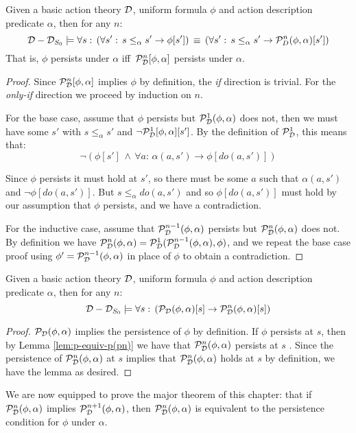 \begin{lemma}
Given a basic action theory $\mathcal{D}$, uniform formula $\phi$
and action description predicate $\alpha$, then for any $n$:\label{lem:p-equiv-p(pn)}\[
\mathcal{D}-\mathcal{D}_{S_{0}}\models\forall s:\,\left(\forall s':\, s\leq_{\alpha}s'\rightarrow\phi[s']\right)\,\equiv\,\left(\forall s':\, s\leq_{\alpha}s'\rightarrow\mathcal{P}_{D}^{n}(\phi,\alpha)[s']\right)\]
 That is, $\phi$ persists under $\alpha$ iff $\,\mathcal{P}_{\mathcal{D}}^{n}[\phi,\alpha]$
persists under $\alpha$. 
\end{lemma}
\begin{proof}
Since $\mathcal{P}_{\mathcal{D}}^{n}[\phi,\alpha]$ implies $\phi$ by definition,
the \emph{if} direction is trivial. For the \emph{only-if} direction
we proceed by induction on $n$.

For the base case, assume that $\phi$ persists but $\mathcal{P}_{\mathcal{D}}^{1}(\phi,\alpha)$
does not, then we must have some $s'$ with $s\leq_{\alpha}s'$ and
$\neg\mathcal{P}_{\mathcal{D}}^{1}[\phi,\alpha][s']$. By the definition of $\mathcal{P}_{\mathcal{D}}^{1}$,
this means that:\[
\neg\left(\phi[s']\,\wedge\,\forall a:\,\alpha(a,s')\rightarrow\phi[do(a,s')]\right)\]


Since $\phi$ persists it must hold at $s'$, so there must be some
$a$ such that $\alpha(a,s')$ and $\neg\phi[do(a,s')]$. But $s\leq_{\alpha}do(a,s')$
and so $\phi[do(a,s')]$ must hold by our assumption that $\phi$
persists, and we have a contradiction.

For the inductive case, assume that $\mathcal{P}_{\mathcal{D}}^{n-1}(\phi,\alpha)$
persists but $\mathcal{P}_{\mathcal{D}}^{n}(\phi,\alpha)$ does not. By definition
we have $\mathcal{P}_{\mathcal{D}}^{n}(\phi,\alpha)=\mathcal{P}_{\mathcal{D}}^{1}(\mathcal{P}_{\mathcal{D}}^{n-1}(\phi,\alpha),\phi)$,
and we repeat the base case proof using $\phi'=\mathcal{P}_{\mathcal{D}}^{n-1}(\phi,\alpha)$
in place of $\phi$ to obtain a contradiction. 
\end{proof}
\begin{lemma}
Given a basic action theory $\mathcal{D}$, uniform formula $\phi$
and action description predicate $\alpha$, then for any $n$:\label{lem:p-implies-pn}\[
\mathcal{D}-\mathcal{D}_{S_{0}}\models\forall s:\,\left(\mathcal{P}_{\mathcal{D}}(\phi,\alpha)[s]\rightarrow\mathcal{P}_{\mathcal{D}}^{n}(\phi,\alpha)[s]\right)\]

\end{lemma}
\begin{proof}
$\mathcal{P}_{\mathcal{D}}(\phi,\alpha)$ implies the persistence of $\phi$
by definition. If $\phi$ persists at $s$, then by Lemma \ref{lem:p-equiv-p(pn)}
we have that $\mathcal{P}_{\mathcal{D}}^{n}(\phi,\alpha)$ persists at $s$ . Since
the persistence of $\mathcal{P}_{\mathcal{D}}^{n}(\phi,\alpha)$ at
$s$ implies that $\mathcal{P}_{\mathcal{D}}^{n}(\phi,\alpha)$ holds
at $s$ by definition, we have the lemma as desired. 
\end{proof}
We are now equipped to prove the major theorem of this chapter: that
if $\mathcal{P}_{\mathcal{D}}^{n}(\phi,\alpha)$ implies $\mathcal{P}_{\mathcal{D}}^{n+1}(\phi,\alpha)$,
then $\mathcal{P}_{\mathcal{D}}^{n}(\phi,\alpha)$ is equivalent to
the persistence condition for $\phi$ under $\alpha$.\newpage{}

